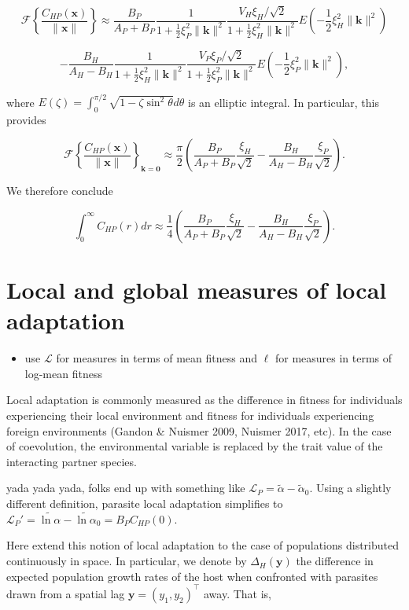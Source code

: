 \documentclass{article}
\begin{document}
\[\mathcal F\left\{\frac{C_{HP}(\pmb x)}{\|\pmb x\|}\right\}\approx\frac{B_P}{A_P+B_P}\frac{1}{1+\frac{1}{2}\xi_P^2\|\pmb k\|^2} \frac{V_H\xi_H/\sqrt2}{1+\frac{1}{2}\xi_H^2\|\pmb k\|^2}E\left(-\frac{1}{2}\xi_H^2\|\pmb k\|^2\right)\]

\[-\frac{B_H}{A_H-B_H}\frac{1}{1+\frac{1}{2}\xi_H^2\|\pmb k\|^2} \frac{V_P\xi_P/\sqrt2}{1+\frac{1}{2}\xi_P^2\|\pmb k\|^2}E\left(-\frac{1}{2}\xi_P^2\|\pmb k\|^2\right),\]

where \(E(\zeta)=\int_0^{\pi/2}\sqrt{1-\zeta\sin^2\theta}d\theta\) is an
elliptic integral. In particular, this provides

\[\mathcal F\left\{\frac{C_{HP}(\pmb x)}{\|\pmb x\|}\right\}_{\pmb k=\pmb 0}\approx\frac{\pi}{2}\left(\frac{B_P}{A_P+B_P}\frac{\xi_H}{\sqrt2}-\frac{B_H}{A_H-B_H}\frac{\xi_P}{\sqrt2}\right).\]

We therefore conclude

\[\int_0^\infty C_{HP}(r)dr\approx\frac{1}{4}\left(\frac{B_P}{A_P+B_P}\frac{\xi_H}{\sqrt2}-\frac{B_H}{A_H-B_H}\frac{\xi_P}{\sqrt2}\right).\]

\hypertarget{local-and-global-measures-of-local-adaptation}{%
\section{Local and global measures of local
adaptation}\label{local-and-global-measures-of-local-adaptation}}

\begin{itemize}
\tightlist
\item
  use \(\mathcal L\) for measures in terms of mean fitness and \(\ell\)
  for measures in terms of log-mean fitness
\end{itemize}

Local adaptation is commonly measured as the difference in fitness for
individuals experiencing their local environment and fitness for
individuals experiencing foreign environments (Gandon \& Nuismer 2009,
Nuismer 2017, etc). In the case of coevolution, the environmental
variable is replaced by the trait value of the interacting partner
species.

yada yada yada, folks end up with something like
\(\mathcal L_P=\tilde\alpha-\tilde\alpha_0\). Using a slightly different
definition, parasite local adaptation simplifies to
\(\mathcal L_P'=\widetilde{\ln\alpha}-\widetilde{\ln\alpha}_0=B_PC_{HP}(0)\).

Here extend this notion of local adaptation to the case of populations
distributed continuously in space. In particular, we denote by
\(\Delta_H(\pmb y)\) the difference in expected population growth rates
of the host when confronted with parasites drawn from a spatial lag
\(\pmb y=(y_1,y_2)^\top\) away. That is,
\end{document}
